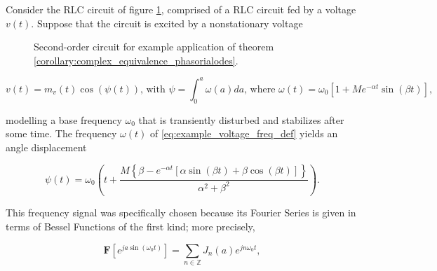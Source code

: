 \begin{example} \label{example:rlc_dpt} %

	Consider the RLC circuit of figure \ref{fig:complexification_example}, comprised of a RLC circuit fed by a voltage $v(t)$. Suppose that the circuit is excited by a nonstationary voltage

\begin{figure}[htb!]
\centering
	\caption{Second-order circuit for example application of theorem \ref{corollary:complex_equivalence_phasorialodes}.}
	\label{fig:complexification_example}
\end{figure} %

\begin{equation} v(t) = m_v(t)\cos\left(\psi(t)\right) \text{, with } \psi = \int_0^a \omega(a)da \text{, where } \omega(t) = \omega_0\left[1 + Me^{-\alpha t}\sin\left(\beta t\right)\right], \label{eq:example_voltage_freq_def}\end{equation}

 	\noindent modelling a base frequency $\omega_0$ that is transiently disturbed and stabilizes after some time. The frequency $\omega(t)$ of \eqref{eq:example_voltage_freq_def} yields an angle displacement

\begin{equation} \psi(t) = \omega_0\left(t + \dfrac{M\left\{\beta - e^{-\alpha t}\left[\alpha\sin\left(\beta t\right) + \beta\cos\left(\beta t\right)\right]\right\}}{\alpha^2 + \beta^2} \right) .\end{equation}

	This frequency signal was specifically chosen because its Fourier Series is given in terms of Bessel Functions of the first kind; more precisely,

\begin{equation} \mathbf{F}\left[e^{ja\sin\left(\omega_0 t\right)}\right] = \sum_{n\in\mathbb{Z}} J_n\left(a\right)e^{jn\omega_0 t} ,\end{equation}


\end{example}
